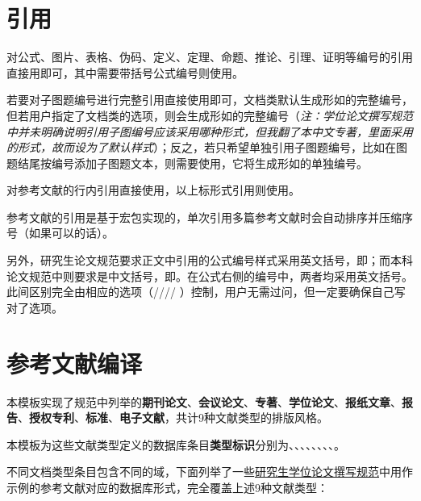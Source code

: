 \documentclass[print, doctor, vlined]{DissertUESTC}
\begin{document}
	
	\section{引用}
	
	对公式、图片、表格、伪码、定义、定理、命题、推论、引理、证明等编号的引用直接用即可，其中需要带括号公式编号则使用。
	
	若要对子图题编号进行完整引用直接使用即可，文档类默认生成形如的完整编号，但若用户指定了文档类的选项，则会生成形如的完整编号（\textit{注：学位论文撰写规范中并未明确说明引用子图编号应该采用哪种形式，但我翻了本中文专著，里面采用的形式，故而设为了默认样式}）；反之，若只希望单独引用子图题编号，比如在图题结尾按编号添加子图题文本，则需要使用，它将生成形如的单独编号。
	
	对参考文献的行内引用直接使用，以上标形式引用则使用。
	
	参考文献的引用是基于宏包实现的，单次引用多篇参考文献时会自动排序并压缩序号（如果可以的话）。

	另外，研究生论文规范要求正文中引用的公式编号样式采用英文括号，即；而本科论文规范中则要求是中文括号，即。在公式右侧的编号中，两者均采用英文括号。此间区别完全由相应的选项（//// ）控制，用户无需过问，但一定要确保自己写对了选项。
	
	
	\section{参考文献编译}
	
	本模板实现了规范中列举的\textbf{期刊论文}、\textbf{会议论文}、\textbf{专著}、\textbf{学位论文}、\textbf{报纸文章}、\textbf{报告}、\textbf{授权专利}、\textbf{标准}、\textbf{电子文献}，共计9种文献类型的排版风格。
	
	本模板为这些文献类型定义的数据库条目\textbf{类型标识}分别为、、、、、、、、。
	
	不同文档类型条目包含不同的域，下面列举了一些\href{https://gr.uestc.edu.cn/xiazai/114/3917}{研究生学位论文撰写规范}中用作示例的参考文献对应的数据库形式，完全覆盖上述9种文献类型：
	
\end{document}
